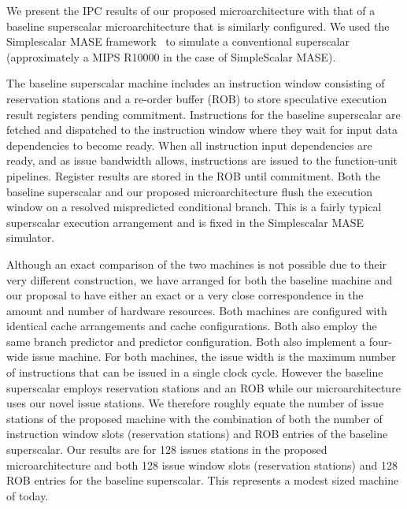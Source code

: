 \documentclass[10pt,twocolumn,dvips]{article}
\begin{document}
We present the IPC results of our proposed
microarchitecture with that of a baseline 
superscalar microarchitecture that is similarly configured.
We used the 
Simplescalar MASE framework~\cite{Austin97}
to simulate a conventional superscalar (approximately a MIPS R10000
in the case of SimpleScalar MASE).

The baseline superscalar machine includes an instruction
window consisting of reservation stations and a re-order buffer (ROB)
to store speculative execution result registers pending commitment.
Instructions for the baseline superscalar are fetched and dispatched
to the instruction window where they wait for input data dependencies to
become ready.  When all instruction input dependencies are ready,
and as issue bandwidth allows, instructions are issued to the
function-unit pipelines.  Register results are stored in the ROB
until commitment.  
Both the baseline superscalar and our proposed
microarchitecture flush the execution window on a resolved mispredicted 
conditional branch.
This is a fairly typical superscalar execution
arrangement and is fixed in the Simplescalar MASE simulator.

Although an exact comparison of the two machines is not possible
due to their very different construction, we have arranged
for both the baseline machine and our proposal to have either an
exact or a very
close correspondence in the amount and number of hardware resources.
Both machines are configured with identical
cache arrangements and cache configurations.
Both also employ the same branch predictor and predictor configuration.
Both also implement a four-wide issue machine.
For both machines, the issue width is the maximum number of
instructions that can be issued in a single clock cycle.
However the baseline superscalar employs reservation stations and
an ROB while our microarchitecture uses our novel issue stations.
We therefore roughly equate the number of issue stations of
the proposed machine with the combination of both the
number of instruction window slots (reservation stations)
and ROB entries of the baseline superscalar.
Our results are for 128 issues stations in the proposed 
microarchitecture and both 128 issue window slots (reservation stations)
and 128 ROB entries for the baseline superscalar.
This represents a modest sized machine of today.
\end{document}
